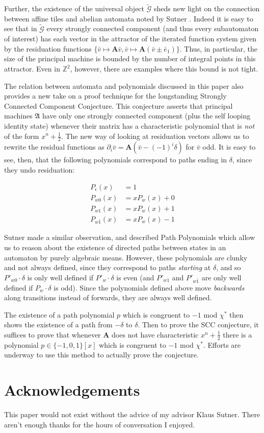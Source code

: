 \documentclass{article}
\newcommand{\G}{\mathcal{G}}
\renewcommand{\P}{\mathfrak{A}}
\newcommand{\Z}{\mathbb{Z}}
\newcommand{\2}{\textbf{2}}
\newcommand{\Am}{\textbf{A}}
\newcommand{\del}{\partial}
\newcommand{\vv}{\bar{v}}
\newcommand{\e}{\bar{e}}
\theoremstyle{definition}
\begin{document}
Further, the existence of the universal object $\widetilde{\G}$ 
sheds new light on the connection between affine tiles
\cite{LagariasWang96:tiles,LagariasWang97:integral_tiles}
and abelian automata noted by Sutner
\cite{Sutner18:abelian_automata}. 
Indeed it is easy to see that in 
$\widetilde{\G}$ every strongly connected component 
(and thus every subautomaton of interest) has each vector in the attractor 
of the iterated function system given by the residuation functions 
$\{ \vv \mapsto \Am \vv, \vv \mapsto \Am (\vv \pm \e_1) \}$.
Thus, in particular, the size of the principal machine is bounded by the
number of integral points in this attractor. Even in $\Z^2$, however, there
are examples where this bound is not tight.

The relation between automata and polynomials discussed in this paper 
also provides a new take on a proof technique for the longstanding
Strongly Connected Component Conjecture. This conjecture 
asserts that principal machines $\P$ have only one strongly connected component 
(plus the self looping identity state) whenever their matrix has a 
characteristic polynomial that is \emph{not} of the form $x^n + \frac{1}{2}$.
The new way of looking at residuation vectors allows us to rewrite the 
residual functions as $\del_i \vv = \Am (\vv - (-1)^i \delta)$ for $\vv$ odd.
It is easy to see, then, that the following polynomials correspond to paths
ending in $\delta$, since they undo residuation:

\begin{align*}
  P_\epsilon(x)   &= 1\\
  P_{w0}(x)       &= xP_w(x) + 0\\
  P_{w1}(x)       &= xP_w(x) + 1\\
  P_{w\bar{1}}(x) &= xP_w(x) - 1
\end{align*}

Sutner made a similar observation, and described Path Polynomials 
\cite{Sutner18:abelian_automata} which
allow us to reason about the existence of directed paths between states 
in an automaton by purely algebraic means. However, these polynomials are
clunky and not always defined, since they correspond to paths
\emph{starting} at $\delta$, and so $P'_{w0} \cdot \delta$ is only well 
defined if $P'_w \cdot \delta$ is even (and $P'_{w1}$ and $P'_{w\bar{1}}$ 
are only well defined if $P_w \cdot \delta$ is odd). Since the polynomials 
defined above move \emph{backwards} along transitions instead of forwards, 
they are always well defined.

The existence of a path polynomial $p$ which is congruent to $-1$ mod $\chi^*$
then shows the existence of a path from $-\delta$ to $\delta$.
Then to prove the SCC conjecture, it suffices to prove that whenever $\Am$ 
does not have characteristic $x^n + \frac{1}{2}$ there is a polynomial 
$p \in \{-1,0,1\}[x]$ which is congruent to $-1$ mod $\chi^*$. 
Efforts are underway to use this method to actually prove the conjecture.

\section*{Acknowledgements}
This paper would not exist without the advice of my advisor Klaus Sutner.
There aren't enough thanks for the hours of conversation I enjoyed.

\newpage



\end{document}
